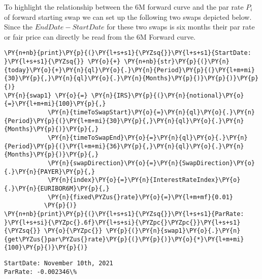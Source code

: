     

    
    To highlight the relationship between the 6M forward curve and the par
rate \(P_i\) of forward starting swap we can set up the following two
swaps depicted below. Since the \(EndDate-StartDate\) for these two
swaps is six months their par rate or fair price can directly be read
from the 6M Forward curve.

    \begin{tcolorbox}[breakable, size=fbox, boxrule=1pt, pad at break*=1mm,colback=cellbackground, colframe=cellborder]
\begin{Verbatim}[commandchars=\\\{\}]
\PY{n+nb}{print}\PY{p}{(}\PY{l+s+s1}{\PYZsq{}}\PY{l+s+s1}{StartDate: }\PY{l+s+s1}{\PYZsq{}} \PY{o}{+} \PY{n+nb}{str}\PY{p}{(}\PY{n}{today}\PY{o}{+}\PY{n}{ql}\PY{o}{.}\PY{n}{Period}\PY{p}{(}\PY{l+m+mi}{30}\PY{p}{,}\PY{n}{ql}\PY{o}{.}\PY{n}{Months}\PY{p}{)}\PY{p}{)}\PY{p}{)}
\PY{n}{swap1} \PY{o}{=} \PY{n}{IRS}\PY{p}{(}\PY{n}{notional}\PY{o}{=}\PY{l+m+mi}{100}\PY{p}{,}
            \PY{n}{timeToSwapStart}\PY{o}{=}\PY{n}{ql}\PY{o}{.}\PY{n}{Period}\PY{p}{(}\PY{l+m+mi}{30}\PY{p}{,}\PY{n}{ql}\PY{o}{.}\PY{n}{Months}\PY{p}{)}\PY{p}{,}
            \PY{n}{timeToSwapEnd}\PY{o}{=}\PY{n}{ql}\PY{o}{.}\PY{n}{Period}\PY{p}{(}\PY{l+m+mi}{36}\PY{p}{,}\PY{n}{ql}\PY{o}{.}\PY{n}{Months}\PY{p}{)}\PY{p}{,}
            \PY{n}{swapDirection}\PY{o}{=}\PY{n}{SwapDirection}\PY{o}{.}\PY{n}{PAYER}\PY{p}{,}
            \PY{n}{index}\PY{o}{=}\PY{n}{InterestRateIndex}\PY{o}{.}\PY{n}{EURIBOR6M}\PY{p}{,}
            \PY{n}{fixed\PYZus{}rate}\PY{o}{=}\PY{l+m+mf}{0.01}
           \PY{p}{)}
\PY{n+nb}{print}\PY{p}{(}\PY{l+s+s1}{\PYZsq{}}\PY{l+s+s1}{ParRate: }\PY{l+s+si}{\PYZpc{}.6f}\PY{l+s+si}{\PYZpc{}\PYZpc{}}\PY{l+s+s1}{\PYZsq{}} \PY{o}{\PYZpc{}} \PY{p}{(}\PY{n}{swap1}\PY{o}{.}\PY{n}{get\PYZus{}par\PYZus{}rate}\PY{p}{(}\PY{p}{)}\PY{o}{*}\PY{l+m+mi}{100}\PY{p}{)}\PY{p}{)}
\end{Verbatim}
\end{tcolorbox}

    \begin{Verbatim}[commandchars=\\\{\}]
StartDate: November 10th, 2021
ParRate: -0.002346\%
    \end{Verbatim}

